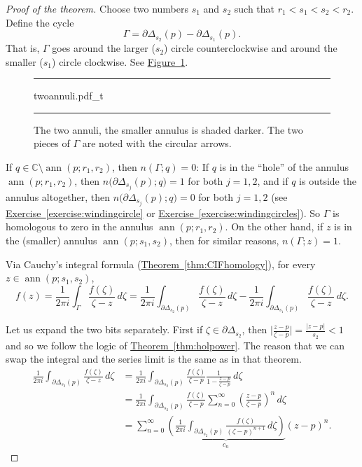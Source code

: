 \documentclass[12pt,openany]{book}
\newcommand{\ann}{\operatorname{ann}}
\newcommand{\sabs}[1]{\lvert {#1} \rvert}
\newcommand{\babs}[1]{\bigl\lvert {#1} \bigr\rvert}
\newcommand{\C}{{\mathbb{C}}}
\newcommand{\myquote}[1]{``#1''}
\theoremstyle{plain}
\theoremstyle{remark}
\theoremstyle{definition}
\newenvironment{myfig}{%
\begin{figure}[h!t]
\noindent\rule{\textwidth}{0.5pt}\vspace{12pt}\par\centering}%
{\par\noindent\rule{\textwidth}{0.5pt}
\end{figure}}
\theoremstyle{exercise}
\theoremstyle{example}
\newcommand{\figureref}[1]{\hyperref[#1]{Figure~\ref*{#1}}}
\newcommand{\exerciseref}[1]{\hyperref[#1]{Exercise~\ref*{#1}}}
\newcommand{\thmref}[1]{\hyperref[#1]{Theorem~\ref*{#1}}}
\begin{document}
\begin{proof}[Proof of the theorem]
Choose two numbers $s_1$ and $s_2$ such that $r_1 < s_1 < s_2 < r_2$.
Define the cycle
\begin{equation*}
\Gamma = \partial \Delta_{s_2}(p) - \partial \Delta_{s_1}(p) .
\end{equation*}
That is, $\Gamma$ goes around the larger ($s_2$) circle counterclockwise and
around the smaller ($s_1$) circle clockwise.
See \figureref{fig:twoannuli}.

\begin{myfig}
{twoannuli.pdf_t}
\caption{The two annuli, the smaller annulus is shaded darker.  The two
pieces of $\Gamma$ are noted with the circular arrows.\label{fig:twoannuli}}
\end{myfig}

If $q \in \C \setminus \ann(p;r_1,r_2)$, then $n(\Gamma;q) = 0$:
If $q$ is in the \myquote{hole} of the annulus $\ann(p;r_1,r_2)$, then
$n\bigl(\partial \Delta_{s_j}(p);q\bigr) = 1$ for both $j=1,2$, and 
if $q$ is outside the annulus altogether, then
$n\bigl(\partial \Delta_{s_j}(p);q\bigr) = 0$ for both $j=1,2$ 
(see \exerciseref{exercise:windingcircle} or
\exerciseref{exercise:windingcircles}).
So $\Gamma$ is homologous to zero in the annulus $\ann(p;r_1,r_2)$.
On the other hand, if $z$ is in the (smaller) annulus $\ann(p;s_1,s_2)$,
then for similar reasons, $n(\Gamma;z) = 1$.

Via Cauchy's integral formula (\thmref{thm:CIFhomology}), for every $z \in \ann(p;s_1,s_2)$,
\begin{equation*}
f(z) = 
\frac{1}{2\pi i}
\int_{\Gamma} \frac{f(\zeta)}{\zeta-z} \, d\zeta 
=
\frac{1}{2\pi i}
\int_{\partial \Delta_{s_2}(p)} \frac{f(\zeta)}{\zeta-z} \, d\zeta 
-
\frac{1}{2\pi i}
\int_{\partial \Delta_{s_1}(p)} \frac{f(\zeta)}{\zeta-z} \, d\zeta  .
\end{equation*}

Let us expand the two bits separately.  First
if $\zeta \in \partial \Delta_{s_2}$, then
$\babs{\frac{z-p}{\zeta-p}} = \frac{\sabs{z-p}}{s_2} < 1$ and so
we follow the logic of \thmref{thm:holpower}.  The reason that we can
swap the integral and the series limit is the same as in that theorem.
\begin{equation*}
\begin{split}
\frac{1}{2\pi i}
\int_{\partial \Delta_{s_2}(p)} \frac{f(\zeta)}{\zeta-z} \, d\zeta 
& =
\frac{1}{2\pi i}
\int_{\partial \Delta_{s_2}(p)} \frac{f(\zeta)}{\zeta-p}
\frac{1}{1-\frac{z-p}{\zeta-p}} \, d\zeta
\\
& =
\frac{1}{2\pi i}
\int_{\partial \Delta_{s_2}(p)} \frac{f(\zeta)}{\zeta-p}
\sum_{n=0}^\infty
{\left(\frac{z-p}{\zeta-p}\right)}^n \, d\zeta
\\
& =
\sum_{n=0}^\infty
\underbrace{
\left(
\frac{1}{2\pi i}
\int_{\partial \Delta_{s_2}(p)} \frac{f(\zeta)}{{(\zeta-p)}^{n+1}}
 \, d\zeta
\right)
}_{c_n}
{(z-p)}^n .
\end{split}
\end{equation*}


\end{proof}
\end{document}
